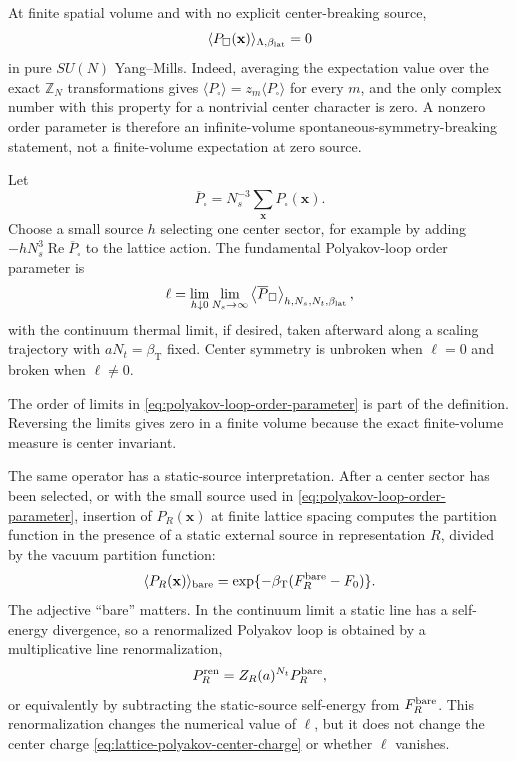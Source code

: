 At finite spatial volume and with no explicit center-breaking source,
\[
  \langle P_\square(\mathbf x)\rangle_{\Lambda,\beta_{\rm lat}}=0
\]
in pure \(SU(N)\) Yang--Mills.  Indeed, averaging the expectation value over
the exact \(\mathbb Z_N\) transformations gives
\(\langle P_\square\rangle=z_m\langle P_\square\rangle\) for every \(m\), and
the only complex number with this property for a nontrivial center character
is zero.  A nonzero order parameter is therefore an infinite-volume
spontaneous-symmetry-breaking statement, not a finite-volume expectation at
zero source.

\begin{definition}
\label{def:polyakov-loop-order-parameter}
Let
\[
  \overline P_\square
  =
  N_s^{-3}\sum_{\mathbf x}P_\square(\mathbf x).
\]
Choose a small source \(h\) selecting one center sector, for example by
adding
\(-hN_s^3\operatorname{Re}\overline P_\square\) to the lattice action.  The
fundamental Polyakov-loop order parameter is
\begin{equation}
  \ell
  =
  \lim_{h\downarrow0}
  \lim_{N_s\to\infty}
  \left\langle\overline P_\square\right\rangle_{h,N_s,N_t,\beta_{\rm lat}},
  \label{eq:polyakov-loop-order-parameter}
\end{equation}
with the continuum thermal limit, if desired, taken afterward along a scaling
trajectory with \(aN_t=\beta_{\mathrm T}\) fixed.  Center symmetry is
unbroken when \(\ell=0\) and broken when \(\ell\neq0\).
\end{definition}

The order of limits in \eqref{eq:polyakov-loop-order-parameter} is part of
the definition.  Reversing the limits gives zero in a finite volume because
the exact finite-volume measure is center invariant.

The same operator has a static-source interpretation.  After a center sector
has been selected, or with the small source used in
\eqref{eq:polyakov-loop-order-parameter}, insertion of \(P_R(\mathbf x)\) at
finite lattice spacing computes the partition function in the presence of a
static external source in representation \(R\), divided by the vacuum
partition function:
\begin{equation}
  \langle P_R(\mathbf x)\rangle_{\rm bare}
  =
  \exp\{-\beta_{\mathrm T}
  (F_R^{\rm bare}-F_0)\}.
  \label{eq:polyakov-loop-static-source-free-energy}
\end{equation}
The adjective ``bare'' matters.  In the continuum limit a static line has a
self-energy divergence, so a renormalized Polyakov loop is obtained by a
multiplicative line renormalization,
\[
  P_R^{\rm ren}
  =
  Z_R(a)^{N_t}P_R^{\rm bare},
\]
or equivalently by subtracting the static-source self-energy from
\(F_R^{\rm bare}\).  This renormalization changes the numerical value of
\(\ell\), but it does not change the center charge
\eqref{eq:lattice-polyakov-center-charge} or whether \(\ell\) vanishes.

